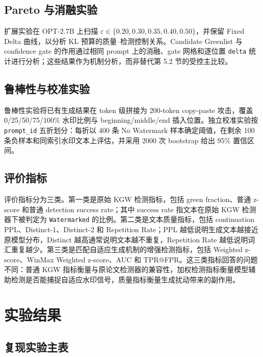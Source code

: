 \documentclass[a4paper,UTF8,zihao=5]{ctexart}
\begin{document}
\subsection{Pareto 与消融实验}

扩展实验在 OPT-2.7B 上扫描 $\varepsilon\in\{0.20,0.30,0.35,0.40,0.50\}$，并保留 Fixed Delta 曲线，以分析 KL 预算的质量--检测控制关系。Candidate Greenlist 与 confidence gate 的作用通过相同 prompt 上的消融、gate 网格和逐位置 \texttt{delta} 统计进行分析；这些结果作为机制分析，而非替代第 5.2 节的受控主比较。

\subsection{鲁棒性与校准实验}

鲁棒性实验将已有生成结果在 token 级拼接为 200-token copy-paste 攻击，覆盖 0/25/50/75/100\% 水印比例与 beginning/middle/end 插入位置。独立校准实验按 \texttt{prompt\_id} 五折划分：每折以 400 条 No Watermark 样本确定阈值，在剩余 100 条负样本和同索引水印文本上评估，并采用 2000 次 bootstrap 给出 95\% 置信区间。

\subsection{评价指标}

评价指标分为三类。第一类是原始 KGW 检测指标，包括 green fraction、普通 z-score 和普通 detection success rate；其中 success rate 指文本在原始 KGW 检测器下被判定为 \texttt{Watermarked} 的比例。第二类是文本质量指标，包括 continuation PPL、Distinct-1、Distinct-2 和 Repetition Rate；PPL 越低说明生成文本越接近原模型分布，Distinct 越高通常说明文本越不重复，Repetition Rate 越低说明词汇重复越少。第三类是匹配自适应生成机制的增强检测指标，包括 Weighted z-score、WinMax Weighted z-score、AUC 和 TPR@FPR。这三类指标回答的问题不同：普通 KGW 指标衡量与原论文检测器的兼容性，加权检测指标衡量模型辅助检测是否能捕捉自适应水印信号，质量指标衡量生成扰动带来的副作用。

\section{实验结果}

\subsection{复现实验主表}
\end{document}

